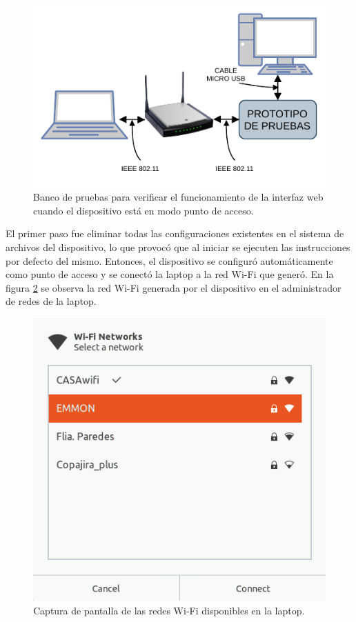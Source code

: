 \begin{figure}[ht]
	\centering
	\includegraphics[scale=1.1]{./Figures/test_interface_bank.pdf}
	\caption{Banco de pruebas para verificar el funcionamiento de la interfaz web cuando el dispositivo está en modo punto de acceso.}
	\label{fig:testInterface}
\end{figure}

El primer paso fue eliminar todas las configuraciones existentes en el sistema de archivos del dispositivo, lo que provocó que al iniciar se ejecuten las instrucciones por defecto del mismo. Entonces, el dispositivo se configuró automáticamente como punto de acceso y se conectó la laptop a la red Wi-Fi que generó. En la figura \ref{fig:testScreenNet} se observa la red Wi-Fi generada por el dispositivo en el administrador de redes de la laptop. 

\begin{figure}[ht]
	\centering
	\includegraphics[scale=0.53]{./Figures/test_interface_nets.png}
	\caption{Captura de pantalla de las redes Wi-Fi disponibles en la laptop.}
	\label{fig:testScreenNet}
\end{figure}


